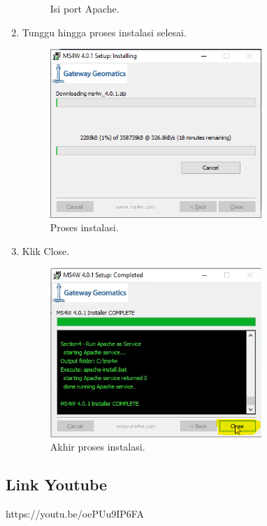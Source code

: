 \begin{enumerate}
\begin{figure}[H]
		\centering
		\caption{Isi port Apache.}
	\end{figure}
	\item  Tunggu hingga proses instalasi selesai.
	\hfill\break
	\begin{figure}[H]
		\includegraphics[width=8cm]{figures/Tugas4/1174083/pic7.png}
		\centering
		\caption{Proses instalasi.}
	\end{figure}
	\item  Klik Close.
	\hfill\break
	\begin{figure}[H]
		\includegraphics[width=8cm]{figures/Tugas4/1174083/pic8.png}
		\centering
		\caption{Akhir proses instalasi.}
	\end{figure}
\end{enumerate}


\subsection{Link Youtube}
https://youtu.be/oePUu9IP6FA


